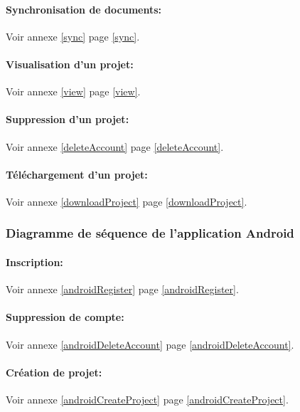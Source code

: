 \documentclass[a4paper,12pt]{article}
\begin{document}
\paragraph{Synchronisation de documents:\\}
Voir annexe \ref{sync} page \ref{sync}.

\paragraph{Visualisation d'un projet:\\}
Voir annexe \ref{view} page \ref{view}.

\paragraph{Suppression d'un projet:\\}
Voir annexe \ref{deleteAccount} page \ref{deleteAccount}.

\paragraph{Téléchargement d'un projet:\\}
Voir annexe \ref{downloadProject} page \ref{downloadProject}.

\subsubsection{Diagramme de séquence de l'application Android}

\paragraph{Inscription:\\}
Voir annexe \ref{androidRegister} page \ref{androidRegister}.

\paragraph{Suppression de compte:\\}
Voir annexe \ref{androidDeleteAccount} page \ref{androidDeleteAccount}.

\paragraph{Création de projet:\\}
Voir annexe \ref{androidCreateProject} page \ref{androidCreateProject}.
\end{document}
